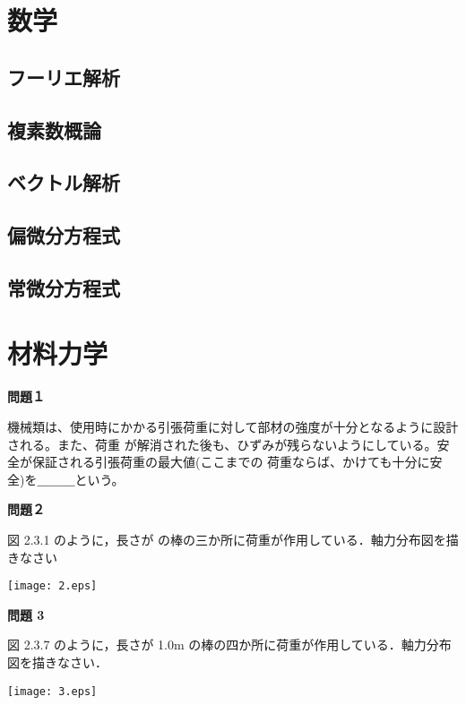 \documentclass[
	a4paper, %
	12pt, %
]{CSSullivanBusinessReport}
\begin{document}
\begin{fullwidth} 
\section{数学} %
\subsection{フーリエ解析}



\subsection{複素数概論}



\subsection{ベクトル解析}

\subsection{偏微分方程式}



\subsection{常微分方程式}



\section{材料力学}
\textbf{問題１}

機械類は、使用時にかかる引張荷重に対して部材の強度が十分となるように設計される。また、荷重
が解消された後も、ひずみが残らないようにしている。安全が保証される引張荷重の最大値(ここまでの
荷重ならば、かけても十分に安全)を＿＿＿という。%

\textbf{問題２}

図 2.3.1 のように，長さが  の棒の三か所に荷重が作用している．軸力分布図を描きなさい

\begin{center}
	\centering 
  \texttt{[image: 2.eps]} 
  \label{fig:2}
\end{center}

\textbf{問題 3}

図 2.3.7 のように，長さが 1.0m の棒の四か所に荷重が作用している．軸力分布図を描きなさい．
\begin{center}
	\centering 
  \texttt{[image: 3.eps]} 
  \label{fig:2}
\end{center}


\end{fullwidth}
\end{document}
